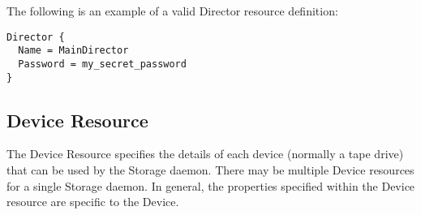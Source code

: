 The following is an example of a valid Director resource definition: 

\footnotesize
\begin{verbatim}
Director {
  Name = MainDirector
  Password = my_secret_password
}
\end{verbatim}
\normalsize

\label{DeviceResource}

\subsection*{Device Resource}

The Device Resource specifies the details of each device (normally a tape
drive) that can be used by the Storage daemon.  There may be multiple
Device resources for a single Storage daemon.  In general, the properties
specified within the Device resource are specific to the Device.

